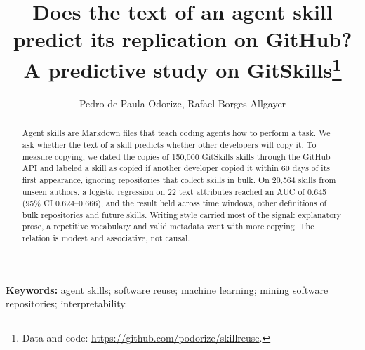 \documentclass[12pt]{article}
\title{Does the text of an agent skill predict its replication on GitHub? A predictive study on GitSkills\footnote{Data and code: \protect\url{https://github.com/podorize/skillreuse}.}}
\author{Pedro de Paula Odorize\inst{1}, Rafael Borges Allgayer\inst{1}}
\begin{document}
\maketitle
\thispagestyle{empty}
\begin{abstract}


Agent skills are Markdown files that teach coding agents how to perform
a task. We ask whether the text of a skill predicts whether other
developers will copy it. To measure copying, we dated the copies of
150,000 GitSkills skills through the GitHub API and labeled a skill as
copied if another developer copied it within 60 days of its first
appearance, ignoring repositories that collect skills in bulk. On 20,564
skills from unseen authors, a logistic regression on 22 text attributes
reached an AUC of 0.645 (95\% CI 0.624--0.666), and the result held
across time windows, other definitions of bulk repositories and future
skills. Writing style carried most of the signal: explanatory prose, a
repetitive vocabulary and valid metadata went with more copying. The
relation is modest and associative, not causal.

\end{abstract}

\noindent\textbf{Keywords:} agent skills; software reuse; machine learning; mining software repositories; interpretability.

















\appendix




\end{document}
